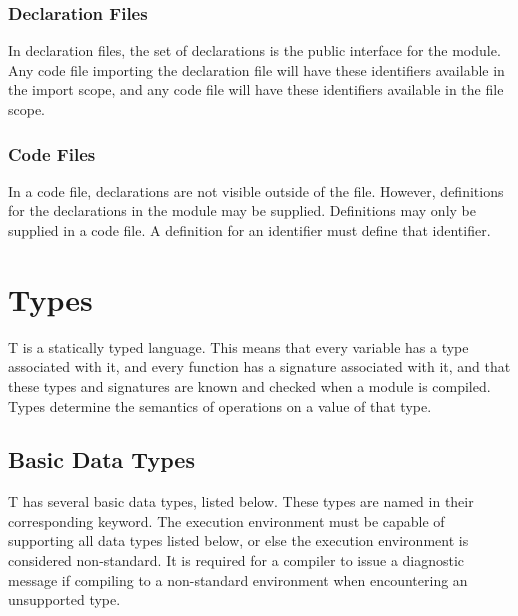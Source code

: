 \documentclass[letterpaper,12pt]{book}
\begin{document}
\subsection{Declaration Files}

In declaration files, the set of declarations is the public interface for the module. Any code file importing the declaration file will have these identifiers available in the import scope, and any code file will have these identifiers available in the file scope.

\subsection{Code Files}

In a code file, declarations are not visible outside of the file. However, definitions for the declarations in the module may be supplied. Definitions may only be supplied in a code file. A definition for an identifier must define that identifier.

\chapter{Types}

T is a statically typed language. This means that every variable has a type associated with it, and every function has a signature associated with it, and that these types and signatures are known and checked when a module is compiled. Types determine the semantics of operations on a value of that type.

\section{Basic Data Types}

T has several basic data types, listed below. These types are named in their corresponding keyword. The execution environment must be capable of supporting all data types listed below, or else the execution environment is considered non-standard. It is required for a compiler to issue a diagnostic message if compiling to a non-standard environment when encountering an unsupported type.
\end{document}
